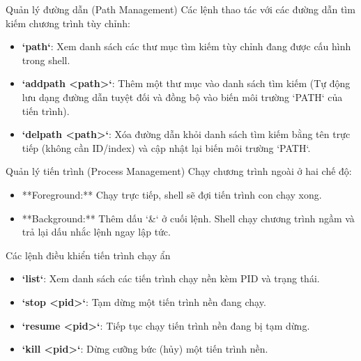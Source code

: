 \documentclass{beamer}
\begin{document}
\begin{frame}{Quản lý đường dẫn (Path Management)}
    Các lệnh thao tác với các đường dẫn tìm kiếm chương trình tùy chỉnh:
    \begin{itemize}
        \item \textbf{`path`}: Xem danh sách các thư mục tìm kiếm tùy chỉnh đang được cấu hình trong shell.
        \item \textbf{`addpath <path>`}: Thêm một thư mục vào danh sách tìm kiếm (Tự động lưu dạng đường dẫn tuyệt đối và đồng bộ vào biến môi trường `PATH` của tiến trình).
        \item \textbf{`delpath <path>`}: Xóa đường dẫn khỏi danh sách tìm kiếm bằng tên trực tiếp (không cần ID/index) và cập nhật lại biến môi trường `PATH`.
    \end{itemize}
\end{frame}

\begin{frame}{Quản lý tiến trình (Process Management)}
    Chạy chương trình ngoài ở hai chế độ:
    \begin{itemize}
        \item **Foreground:** Chạy trực tiếp, shell sẽ đợi tiến trình con chạy xong.
        \item **Background:** Thêm dấu `&` ở cuối lệnh. Shell chạy chương trình ngầm và trả lại dấu nhắc lệnh ngay lập tức.
    \end{itemize}
    \begin{block}{Các lệnh điều khiển tiến trình chạy ẩn}
        \begin{itemize}
            \item \textbf{`list`}: Xem danh sách các tiến trình chạy nền kèm PID và trạng thái.
            \item \textbf{`stop <pid>`}: Tạm dừng một tiến trình nền đang chạy.
            \item \textbf{`resume <pid>`}: Tiếp tục chạy tiến trình nền đang bị tạm dừng.
            \item \textbf{`kill <pid>`}: Dừng cưỡng bức (hủy) một tiến trình nền.
        \end{itemize}
    \end{block}
\end{frame}
\end{document}
